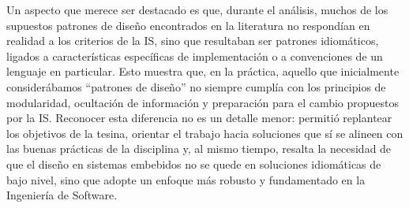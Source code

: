 Un aspecto que merece ser destacado es que, durante el análisis, muchos de los supuestos patrones de diseño encontrados en la literatura no respondían en realidad a los criterios de la \gls{IS}, sino que resultaban ser patrones idiomáticos, ligados a características específicas de implementación o a convenciones de un lenguaje en particular. Esto muestra que, en la práctica, aquello que inicialmente considerábamos ``patrones de diseño'' no siempre cumplía con los principios de modularidad, ocultación de información y preparación para el cambio propuestos por la \gls{IS}. Reconocer esta diferencia no es un detalle menor: permitió replantear los objetivos de la tesina, orientar el trabajo hacia soluciones que sí se alineen con las buenas prácticas de la disciplina y, al mismo tiempo, resalta la necesidad de que el diseño en sistemas embebidos no se quede en soluciones idiomáticas de bajo nivel, sino que adopte un enfoque más robusto y fundamentado en la Ingeniería de Software.



